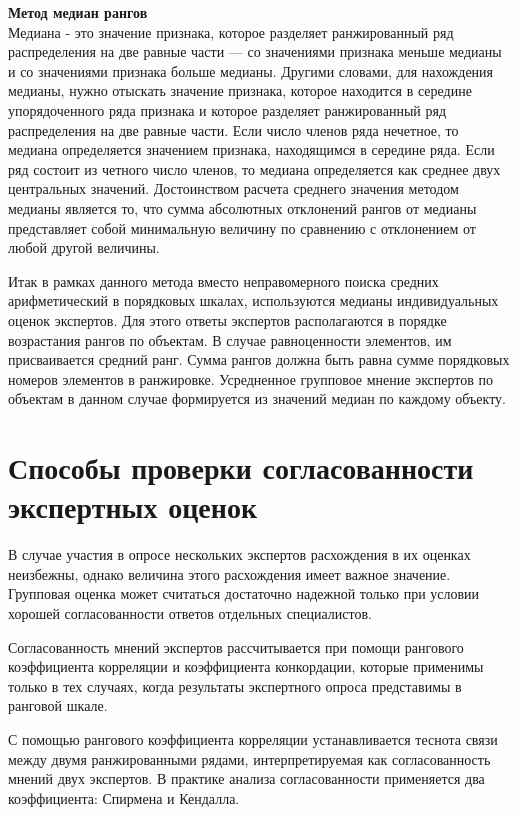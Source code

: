 \documentclass[a4paper,12pt]{extreport}
\begin{document}
\noindent \textbf{Метод медиан рангов}\hfill \\
Медиана - это значение признака, которое разделяет ранжированный ряд распределения
на две равные части — со значениями признака меньше медианы и со значениями признака
больше медианы. Другими словами, для нахождения медианы, нужно отыскать значение
признака, которое находится в середине упорядоченного ряда признака и которое разделяет
ранжированный ряд распределения на две равные части. Если число членов ряда нечетное,
то медиана определяется значением признака, находящимся в середине ряда. Если ряд
состоит из четного число членов, то медиана определяется как среднее двух центральных
значений. Достоинством расчета среднего значения методом медианы является то, что сумма
абсолютных отклонений рангов от медианы представляет собой минимальную величину
по сравнению с отклонением от любой другой величины.

Итак в рамках данного метода вместо неправомерного поиска средних арифметический
в порядковых шкалах, используются медианы индивидуальных оценок экспертов. Для
этого ответы экспертов располагаются в порядке возрастания рангов по объектам. В
случае равноценности элементов, им присваивается средний ранг. Сумма рангов должна
быть равна сумме порядковых номеров элементов в ранжировке. Усредненное групповое
мнение экспертов по объектам в данном случае формируется из значений медиан по каждому
объекту.



\section*{Способы проверки согласованности экспертных оценок} %
\label{sec:expert_opinion_concordance}

В случае участия в опросе нескольких экспертов расхождения в их оценках неизбежны,
однако величина этого расхождения имеет важное значение. Групповая оценка может
считаться достаточно надежной только при условии хорошей согласованности ответов
отдельных специалистов.

Согласованность мнений экспертов рассчитывается при помощи рангового коэффициента
корреляции и коэффициента конкордации, которые применимы только в тех случаях, когда
результаты экспертного опроса представимы в ранговой шкале.

С помощью рангового коэффициента корреляции устанавливается теснота связи между двумя ранжированными рядами, интерпретируемая как согласованность мнений двух экспертов. В практике анализа согласованности применяется два коэффициента: Спирмена и Кендалла.
\end{document}
